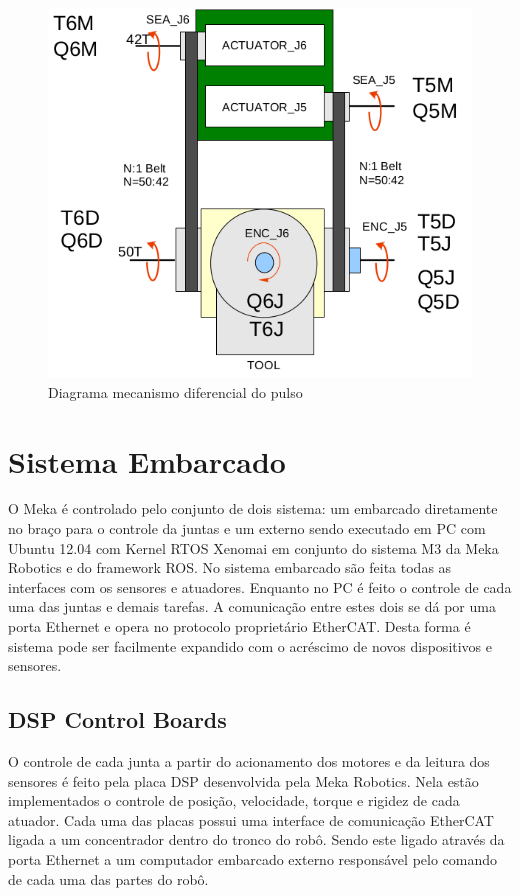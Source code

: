 \begin{figure}[H]
    \centering
    \includegraphics[width = 0.6\linewidth]{tex/figs/meka_wrist.png}
    \caption{Diagrama mecanismo diferencial do pulso \cite{mekartfd}}
    \label{fig:meka-wrist}
\end{figure}

\section{Sistema Embarcado}

O Meka é controlado pelo conjunto de dois sistema: um embarcado diretamente no braço para o controle da juntas e um externo sendo executado em PC com Ubuntu 12.04 com Kernel RTOS Xenomai em conjunto do sistema M3 da Meka Robotics e do framework ROS. No sistema embarcado são feita todas as interfaces com os sensores e atuadores. Enquanto no PC é feito o controle de cada uma das juntas e demais tarefas. A comunicação entre estes dois se dá por uma porta Ethernet e opera no protocolo proprietário EtherCAT. Desta forma é sistema pode ser facilmente expandido com o acréscimo de novos dispositivos e sensores.

\subsection{DSP Control Boards}
O controle de cada junta a partir do acionamento dos motores e da leitura dos sensores é feito pela placa DSP desenvolvida pela Meka Robotics. Nela estão implementados o controle de posição, velocidade, torque e rigidez de cada atuador. Cada uma das placas possui uma interface de comunicação EtherCAT ligada a um concentrador dentro do tronco do robô. Sendo este ligado através da porta Ethernet a um computador embarcado externo responsável pelo comando de cada uma das partes do robô.

